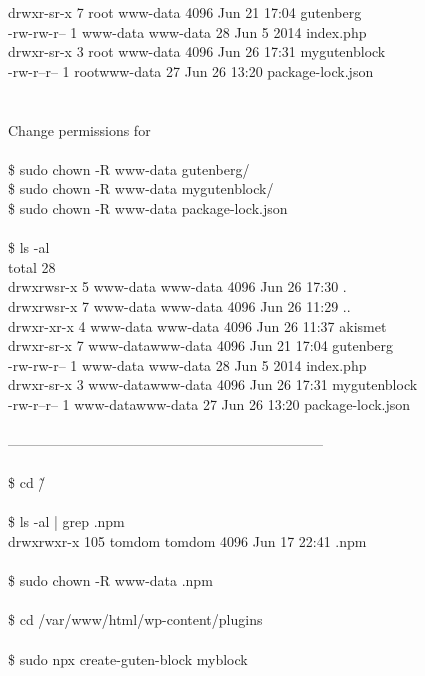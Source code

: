 \documentclass[10pt,a4paper]{article}
\begin{document}
{{{{{{{{{{{{{{{{drwxr-sr-x   7 root    }{\large          www-data 4096 Jun 21 17:04 gutenberg\\
-rw-rw-r--     1 www-data  www-data   28 Jun  5  2014 index.php\\
drwxr-sr-x    3 root }{\large            www-data 4096 Jun 26 17:31 mygutenblock\\
-rw-r--r--       1 root}{\large             www-data   27 Jun 26 13:20 package-lock.json\\
\\
\\
Change permissions for \\
\\
\$ sudo chown -R www-data  gutenberg/\\
\$ sudo chown -R www-data  mygutenblock/\\
\$ sudo chown -R www-data  package-lock.json\\
\\
\$ ls -al\\
total 28\\
drwxrwsr-x 5 www-data www-data 4096 Jun 26 17:30 .\\
drwxrwsr-x 7 www-data www-data 4096 Jun 26 11:29 ..\\
drwxr-xr-x   4 www-data www-data 4096 Jun 26 11:37 akismet\\
drwxr-sr-x   7 www-data}{\large  www-data 4096 Jun 21 17:04 gutenberg\\
-rw-rw-r--    1 www-data www-data   28 Jun  5  2014 index.php\\
drwxr-sr-x   3 www-data}{\large  www-data 4096 Jun 26 17:31 mygutenblock\\
-rw-r--r-- 	   1 www-data}{\large  www-data   27 Jun 26 13:20 package-lock.json\\
\\
--------------------------------------------------------------------\\
\\
\$ cd \~/\\
\\
\$ ls -al | grep .npm\\
drwxrwxr-x 105 tomdom tomdom    4096 Jun 17 22:41 .npm\\
\\
\$ sudo chown -R www-data .npm\\
\\
\$ cd /var/www/html/wp-content/plugins}{\large \\
\\
\$ sudo npx create-guten-block myblock\\
}}}}}}}}}}}}}}}}
\end{document}
